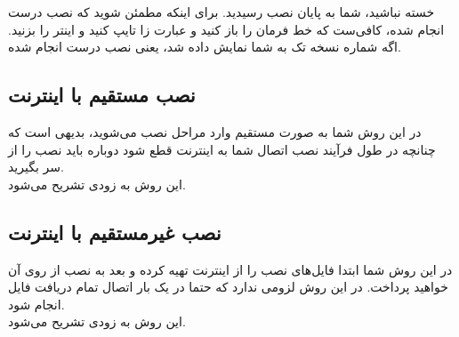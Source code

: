 خسته نباشید، شما به پایان نصب رسیدید. برای اینکه مطمئن شوید که نصب درست انجام شده، کافی‌ست که خط فرمان را باز کنید و عبارت  زا تایپ کنید و اینتر را بزنید. اگه شماره نسخه تک به شما نمایش داده شد، یعنی نصب درست انجام شده.
\subsection{نصب مستقیم با اینترنت}
در این روش شما به صورت مستقیم وارد مراحل نصب می‌شوید، بدیهی است که چنانچه در طول فرآیند نصب اتصال شما به اینترنت قطع شود دوباره باید نصب را از سر بگیرید.\\
این روش به زودی تشریح می‌شود.
\subsection{نصب غیرمستقیم با اینترنت}
در این روش شما ابتدا فایل‌های نصب را از اینترنت تهیه کرده و بعد به نصب از روی آن خواهید پرداخت. در این روش لزومی ندارد که حتما در یک بار اتصال تمام دریافت فایل انجام شود.\\
این روش به زودی تشریح می‌شود.
%
